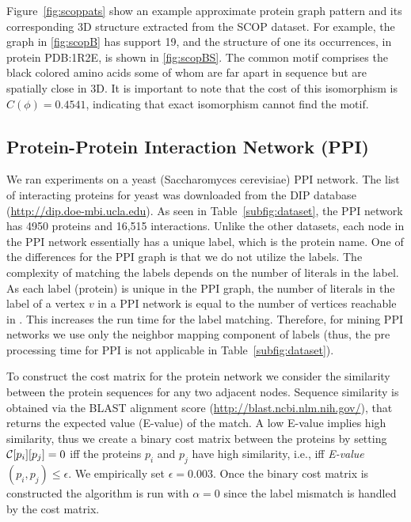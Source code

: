 \smallskip{}
Figure~\ref{fig:scoppats} show an example approximate protein graph
pattern and its corresponding 3D structure extracted from the SCOP
dataset.  
For example, the graph in \ref{fig:scopB} has support 19, and the
structure of one its occurrences, in protein PDB:1R2E, is shown in
\ref{fig:scopBS}. The common motif comprises the black colored amino
acids some of whom are far apart in sequence but are spatially close in 3D.
It is important to note that the cost of this isomorphism
is $C(\phi) = 0.4541$, indicating that exact isomorphism cannot find the
motif.

\subsection{Protein-Protein Interaction Network (PPI)} We ran
experiments on a yeast (Saccharomyces cerevisiae) PPI network. The list of
interacting proteins for yeast was downloaded from the DIP database
(\url{http://dip.doe-mbi.ucla.edu}). As seen in
Table~\ref{subfig:dataset}, the
PPI network has 4950 proteins and 16,515 interactions.  Unlike the other
datasets, each node in the PPI network essentially has a unique label,
which is the protein name.  
One of the differences for
the PPI graph is that we do not utilize the \khop labels.  The
complexity of matching the \khop labels depends on the number of
literals in the \khop label.  As each label (protein) is unique in the
PPI graph, the number of literals in the \khop label of a vertex $v$ in
a PPI network is equal to the number of vertices reachable in \khops.
This increases the run time for the \khop label matching.  Therefore,
for mining PPI networks we use only the neighbor mapping component of 
\ncl labels (thus, the
pre processing time for PPI is not applicable in
Table~\ref{subfig:dataset}).

\smallskip{} 
To construct the cost matrix for the protein network we consider the
similarity between the protein sequences for any two adjacent nodes.
Sequence similarity is obtained via the BLAST alignment
score (\url{http://blast.ncbi.nlm.nih.gov/}), that returns the expected value (E-value) of
the match. A low E-value implies high similarity, thus we create a
binary cost matrix between the proteins by setting
${\mathcal{C}}[p_i][p_j] =0$ iff the proteins $p_i$ and $p_j$ have high
similarity, i.e., iff {\em E-value}$(p_i, p_j) \le \epsilon$. We empirically 
set $\epsilon = 0.003$. Once the binary cost matrix is constructed the algorithm
is run with $\alpha = 0$ since the label mismatch is handled by the cost matrix.


